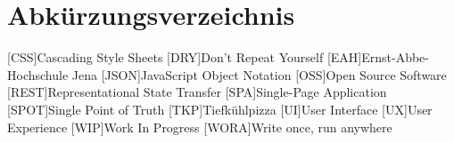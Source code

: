 \section*{Abkürzungsverzeichnis}
\begin{acronym}[xxxxxxx]\itemsep0pt
    [CSS]{Cascading Style Sheets}
    [DRY]{Don’t Repeat Yourself}
    [EAH]{Ernst-Abbe-Hochschule Jena}
    [JSON]{JavaScript Object Notation}
    [OSS]{Open Source Software}
    [REST]{Representational State Transfer}
    [SPA]{Single-Page Application}
    [SPOT]{Single Point of Truth}
    [TKP]{Tiefkühlpizza}
    [UI]{User Interface}
    [UX]{User Experience}
    [WIP]{Work In Progress}
    [WORA]{Write once, run anywhere}
\end{acronym}
